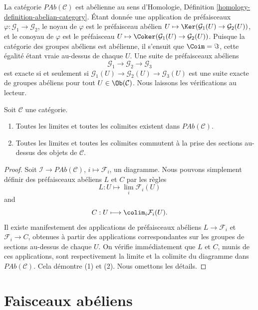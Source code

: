 \medskip\noindent
La catégorie $\textit{PAb}(\mathcal{C})$ est abélienne au sens d'Homologie,
Définition \ref{homology-definition-abelian-category}. Étant donnée une
application de préfaisceaux $\varphi : \mathcal{G}_1 \to \mathcal{G}_2$, le
noyau de $\varphi$ est le préfaisceau abélien
$U \mapsto \Ker(\mathcal{G}_1(U) \to \mathcal{G}_2(U))$, et le conoyau de
$\varphi$ est
le préfaisceau $U \mapsto
\Coker(\mathcal{G}_1(U) \to \mathcal{G}_2(U))$. Puisque la catégorie des
groupes abéliens est abélienne, il s'ensuit que $\Coim = \Im$, cette égalité
étant vraie au-dessus de chaque $U$. Une suite de préfaisceaux abéliens
$$
\mathcal{G}_1 \longrightarrow
\mathcal{G}_2 \longrightarrow
\mathcal{G}_3
$$
est exacte si et seulement si
$\mathcal{G}_1(U) \to \mathcal{G}_2(U) \to \mathcal{G}_3(U)$
est une suite exacte de groupes abéliens pour tout $U \in \Ob(\mathcal{C})$.
Nous laissons les vérifications au lecteur.

\begin{lemma}
\label{lemma-limits-colimits-abelian-presheaves}
Soit $\mathcal{C}$ une catégorie.
\begin{enumerate}
\item Toutes les limites et toutes les colimites existent dans
$\textit{PAb}(\mathcal{C})$.
\item Toutes les limites et toutes les colimites commutent à la prise des
sections au-dessus des objets de $\mathcal{C}$.
\end{enumerate}
\end{lemma}

\begin{proof}
Soit $\mathcal{I} \to \textit{PAb}(\mathcal{C})$, $i \mapsto \mathcal{F}_i$,
un diagramme. Nous pouvons simplement définir des préfaisceaux abéliens $L$ et
$C$ par les règles
$$
L : U \longmapsto \lim_i \mathcal{F}_i(U)
$$
and
$$
C : U \longmapsto \colim_i \mathcal{F}_i(U).
$$
Il existe manifestement des applications de préfaisceaux abéliens
$L \to \mathcal{F}_i$ et $\mathcal{F}_i \to C$, obtenues à partir des
applications correspondantes sur les groupes de sections au-dessus de chaque
$U$. On vérifie immédiatement que $L$ et $C$, munis de ces applications, sont
respectivement la limite et la colimite du diagramme dans
$\textit{PAb}(\mathcal{C})$. Cela démontre (1) et (2). Nous omettons les
détails.
\end{proof}


\section{Faisceaux abéliens}
\label{section-abelian-sheaves}


